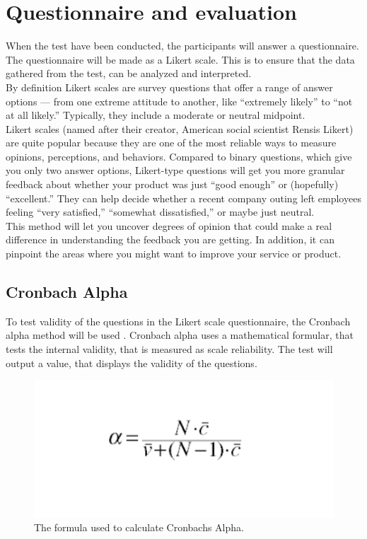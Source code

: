 \section{Questionnaire and evaluation}
When the test have been conducted, the participants will answer a questionnaire. The questionnaire will be made as a Likert scale. This is to ensure that the data gathered from the test, can be analyzed and interpreted\cite{likertScale}.\\

By definition Likert scales are survey questions that offer a range of answer options — from one extreme attitude to another, like “extremely likely” to “not at all likely.” Typically, they include a moderate or neutral midpoint\cite{likertScale}.\\


Likert scales (named after their creator, American social scientist Rensis Likert) are quite popular because they are one of the most reliable ways to measure opinions, perceptions, and behaviors\cite{likertScale}.
Compared to binary questions, which give you only two answer options, Likert-type questions will get you more granular feedback about whether your product was just “good enough” or (hopefully) “excellent.” They can help decide whether a recent company outing left employees feeling “very satisfied,” “somewhat dissatisfied,” or maybe just neutral\cite{likertScale}.\\


This method will let you uncover degrees of opinion that could make a real difference in understanding the feedback you are getting. In addition, it can pinpoint the areas where you might want to improve your service or product\cite{likertScale}.\\

\subsection{Cronbach Alpha}\label{sec:cronbachAlpha}
To test validity of the questions in the Likert scale questionnaire, the Cronbach alpha method will be used \cite{DAEBook}. Cronbach alpha uses a mathematical formular, that tests the internal validity, that is measured as scale reliability. The test will output a value, that displays the validity of the questions\cite{DAEBook}.
\begin{figure}[H]
	\centering
	\includegraphics[width=0.9\linewidth]{figure/Methods/CAformel.png} 
	\caption{The formula used to calculate Cronbachs Alpha.}
	\label{fig:cronbachAlphaFormel}
\end{figure}
 


